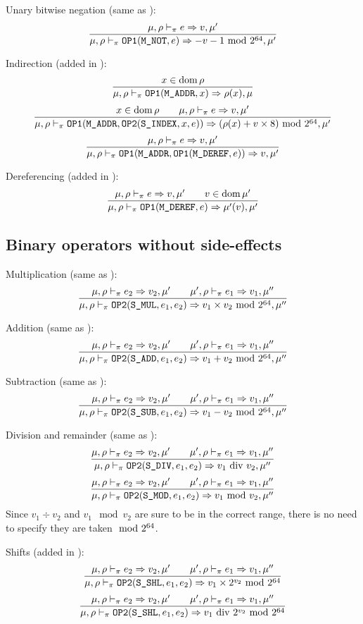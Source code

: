 Unary bitwise negation (same as \Cmm):
\[\dfrac{\mu,\rho\vdash_\pi e\Rightarrow v,\mu'}{\mu,\rho\vdash_\pi \texttt{OP1}(\texttt{M\_NOT}, e) \Rightarrow -v-1 \text{ mod } 2^{64},\mu'}\]

Indirection (added in \Cpm):
\[\dfrac{x\in\operatorname{dom}\rho}{\mu,\rho\vdash_\pi \texttt{OP1}(\texttt{M\_ADDR}, x)\Rightarrow \rho(x),\mu}\]
\[\dfrac{x\in\operatorname{dom}\rho \qquad \mu,\rho\vdash_\pi e\Rightarrow v,\mu'}{\mu,\rho\vdash_\pi \texttt{OP1}(\texttt{M\_ADDR}, \texttt{OP2}(\texttt{S\_INDEX}, x, e)) \Rightarrow (\rho(x)+v\times 8) \text{ mod } 2^{64}, \mu'}\]
\[\dfrac{\mu,\rho\vdash_\pi e\Rightarrow v,\mu'}{\mu,\rho\vdash_\pi \texttt{OP1}(\texttt{M\_ADDR}, \texttt{OP1}(\texttt{M\_DEREF}, e)) \Rightarrow v,\mu'}\]

Dereferencing (added in \Cpm):
\[\dfrac{\mu,\rho\vdash_\pi e\Rightarrow v,\mu' \qquad v\in\operatorname{dom}\mu'}{\mu,\rho\vdash_\pi \texttt{OP1}(\texttt{M\_DEREF}, e) \Rightarrow \mu'(v),\mu'}\]

\subsection{Binary operators without side-effects}
Multiplication (same as \Cmm):
\[\dfrac{\mu,\rho\vdash_\pi e_2\Rightarrow v_2,\mu' \qquad \mu',\rho\vdash_\pi e_1\Rightarrow v_1,\mu''}{\mu,\rho\vdash_\pi \texttt{OP2}(\texttt{S\_MUL}, e_1, e_2) \Rightarrow v_1\times v_2\text{ mod } 2^{64},\mu''}\]

Addition (same as \Cmm):
\[\dfrac{\mu,\rho\vdash_\pi e_2\Rightarrow v_2,\mu' \qquad \mu',\rho\vdash_\pi e_1\Rightarrow v_1,\mu''}{\mu,\rho\vdash_\pi \texttt{OP2}(\texttt{S\_ADD}, e_1, e_2) \Rightarrow v_1 + v_2\text{ mod } 2^{64},\mu''}\]

Subtraction (same as \Cmm):
\[\dfrac{\mu,\rho\vdash_\pi e_2\Rightarrow v_2,\mu' \qquad \mu',\rho\vdash_\pi e_1\Rightarrow v_1,\mu''}{\mu,\rho\vdash_\pi \texttt{OP2}(\texttt{S\_SUB}, e_1, e_2) \Rightarrow v_1 - v_2\text{ mod } 2^{64},\mu''}\]

Division and remainder (same as \Cmm):
\[\dfrac{\mu,\rho\vdash_\pi e_2\Rightarrow v_2,\mu' \qquad \mu',\rho\vdash_\pi e_1\Rightarrow v_1,\mu''}{\mu,\rho\vdash_\pi \texttt{OP2}(\texttt{S\_DIV}, e_1, e_2) \Rightarrow v_1 \text{ div } v_2,\mu''}\]
\[\dfrac{\mu,\rho\vdash_\pi e_2\Rightarrow v_2,\mu' \qquad \mu',\rho\vdash_\pi e_1\Rightarrow v_1,\mu''}{\mu,\rho\vdash_\pi \texttt{OP2}(\texttt{S\_MOD}, e_1, e_2) \Rightarrow v_1 \text{ mod } v_2,\mu''}\]
Since \(v_1 \div v_2\) and \(v_1 \mod v_2\) are sure to be in the correct range, there is no need to specify they are taken \(\text{ mod } 2^{64}\).

Shifts (added in \Cpm):
\[\dfrac{\mu,\rho\vdash_\pi e_2\Rightarrow v_2,\mu' \qquad \mu',\rho\vdash_\pi e_1\Rightarrow v_1,\mu''}{\mu,\rho\vdash_\pi \texttt{OP2}(\texttt{S\_SHL}, e_1, e_2) \Rightarrow v_1 \times 2^{v_2} \text{ mod } 2^{64}}\]
\[\dfrac{\mu,\rho\vdash_\pi e_2\Rightarrow v_2,\mu' \qquad \mu',\rho\vdash_\pi e_1\Rightarrow v_1,\mu''}{\mu,\rho\vdash_\pi \texttt{OP2}(\texttt{S\_SHL}, e_1, e_2) \Rightarrow v_1 \text{ div } 2^{v_2} \text{ mod } 2^{64}}\]



